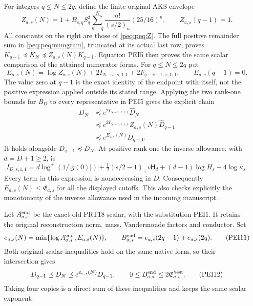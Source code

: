 For integers $q\le N\le2q$, define the finite original AKS envelope
\[
 Z_{a,s}(N)=1+B_{s,q}S_q^2
             \sum_{n=q}^{N}\frac{n!}{(s/2)_n}(25/16)^n,
 \qquad Z_{a,s}(q-1)=1.                                         \tag{PEI7}
\]
All constants on the right are those of \eqref{peq:peq:Z}. The full
positive remainder sum in \eqref{peq:peq:numgram}, truncated at its actual
last row, proves
$K_{q-1}\preceq K_N\preceq Z_{a,s}(N)K_{q-1}$.
Equation PEI5 then proves the same scalar comparison of the attained
numerator forms. For $q\le N\le2q$ put
\[
 E_{a,s}(N)=\log Z_{a,s}(N)
           +2I_{N-v,s,1,1}+2F_{q-v-1,s,1,1},
 \qquad E_{a,s}(q-1)=0.                                        \tag{PEI8}
\]
The value zero at $q-1$ is the exact identity of the endpoint with
itself, not the positive expression applied outside its stated range.
Applying the two rank-one bounds for $B_D$ to every representative
in PEI5 gives the explicit chain
\[
 \begin{split}
 D_N&\preceq e^{2I_{N-v,s,1,1}}\widehat D_N\\
    &\preceq e^{2I_{N-v,s,1,1}}Z_{a,s}(N)\widehat D_{q-1}\\
    &\preceq e^{E_{a,s}(N)}D_{q-1}.
 \end{split}                                                     \tag{PEI9}
\]
It holds alongside $D_{q-1}\preceq D_N$.
At positive rank one the inverse allowance, with $d=D+1\ge2$, is
\[
 I_{D,s,1,1}
 =d\log^+(1/|g(0)|)
  +\tfrac12(s/2-1)_+v\mathsf H_d
  +(d-1)\log H_s+4\log\kappa_s.
                                                               \tag{PEI10}
\]
Every term in this expression is nondecreasing in $D$.
Consequently $E_{a,s}(N)\le\mathfrak E_{a,s}$ for all the displayed
cutoffs. This also checks explicitly the monotonicity of the inverse
allowance used in the incoming manuscript.

Let $A^{\rm end}_{a,s}$ be the exact old PRT18 scalar, with the
substitution PEI1. It retains the original reconstruction norm, mass,
Vandermonde factors and conductor. Set
\[
 e_{a,s}(N)=\min\{\log A^{\rm end}_{a,s},E_{a,s}(N)\},\qquad
 B^{\rm end}_{a,s}=e_{a,s}(2q-1)+e_{a,s}(2q).
                                                               \tag{PEI11}
\]
Both original scalar inequalities hold on the same native form, so
their intersection gives
\[
 D_{q-1}\preceq D_N\preceq e^{e_{a,s}(N)}D_{q-1},
 \qquad
 0\le B^{\rm end}_{a,s}\le2\mathfrak E^{\rm best}_{a,s}.
                                                               \tag{PEI12}
\]
Taking four copies is a direct sum of these inequalities and keeps
the same scalar exponent.

